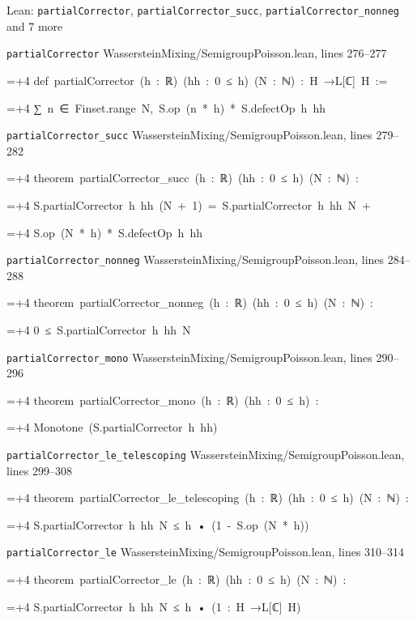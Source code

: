 \documentclass[11pt,a4paper]{article}
\newlength{\leancharwidth}
\newenvironment{leancode}{\par\smallskip\begingroup\ttfamily\footnotesize\raggedright
  \settowidth{\leancharwidth}{M}\setlength{\parskip}{0pt}\setlength{\parindent}{0pt}
  \frenchspacing}{\par\endgroup\smallskip}
\newcommand{\leanline}[2]{\hangindent=\dimexpr#1\leancharwidth+4\leancharwidth\relax
  \hangafter=1\noindent\hspace*{#1\leancharwidth}#2\par}
\newcommand{\leansource}[1]{\par{\footnotesize\color{leanmuted}#1}\par}
\begin{document}
\begin{leanbox}{Lean: \texttt{partialCorrector}, \texttt{partialCorrector\_\allowbreak{}succ}, \texttt{partialCorrector\_\allowbreak{}nonneg} and 7 more}
\leansource{\texttt{partialCorrector} \quad WassersteinMixing/\allowbreak{}SemigroupPoisson.lean, lines 276–277}
\begin{leancode}
\leanline{0}{def\ partialCorrector\ (h\ :\ ℝ)\ (hh\ :\ 0\ ≤\ h)\ (N\ :\ ℕ)\ :\ H\ →L[ℂ]\ H\ :=}
\leanline{2}{∑\ n\ ∈\ Finset.range\ N,\ S.op\ (n\ *\ h)\ *\ S.defectOp\ h\ hh}
\end{leancode}
\leansource{\texttt{partialCorrector\_\allowbreak{}succ} \quad WassersteinMixing/\allowbreak{}SemigroupPoisson.lean, lines 279–282}
\begin{leancode}
\leanline{0}{theorem\ partialCorrector\_succ\ (h\ :\ ℝ)\ (hh\ :\ 0\ ≤\ h)\ (N\ :\ ℕ)\ :}
\leanline{4}{S.partialCorrector\ h\ hh\ (N\ +\ 1)\ =\ S.partialCorrector\ h\ hh\ N\ +}
\leanline{6}{S.op\ (N\ *\ h)\ *\ S.defectOp\ h\ hh}
\end{leancode}
\leansource{\texttt{partialCorrector\_\allowbreak{}nonneg} \quad WassersteinMixing/\allowbreak{}SemigroupPoisson.lean, lines 284–288}
\begin{leancode}
\leanline{0}{theorem\ partialCorrector\_nonneg\ (h\ :\ ℝ)\ (hh\ :\ 0\ ≤\ h)\ (N\ :\ ℕ)\ :}
\leanline{4}{0\ ≤\ S.partialCorrector\ h\ hh\ N}
\end{leancode}
\leansource{\texttt{partialCorrector\_\allowbreak{}mono} \quad WassersteinMixing/\allowbreak{}SemigroupPoisson.lean, lines 290–296}
\begin{leancode}
\leanline{0}{theorem\ partialCorrector\_mono\ (h\ :\ ℝ)\ (hh\ :\ 0\ ≤\ h)\ :}
\leanline{4}{Monotone\ (S.partialCorrector\ h\ hh)}
\end{leancode}
\leansource{\texttt{partialCorrector\_\allowbreak{}le\_\allowbreak{}telescoping} \quad WassersteinMixing/\allowbreak{}SemigroupPoisson.lean, lines 299–308}
\begin{leancode}
\leanline{0}{theorem\ partialCorrector\_le\_telescoping\ (h\ :\ ℝ)\ (hh\ :\ 0\ ≤\ h)\ (N\ :\ ℕ)\ :}
\leanline{4}{S.partialCorrector\ h\ hh\ N\ ≤\ h\ •\ (1\ -\ S.op\ (N\ *\ h))}
\end{leancode}
\leansource{\texttt{partialCorrector\_\allowbreak{}le} \quad WassersteinMixing/\allowbreak{}SemigroupPoisson.lean, lines 310–314}
\begin{leancode}
\leanline{0}{theorem\ partialCorrector\_le\ (h\ :\ ℝ)\ (hh\ :\ 0\ ≤\ h)\ (N\ :\ ℕ)\ :}
\leanline{4}{S.partialCorrector\ h\ hh\ N\ ≤\ h\ •\ (1\ :\ H\ →L[ℂ]\ H)}

\end{leancode}
\end{leanbox}
\end{document}
